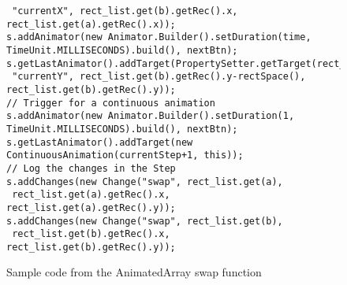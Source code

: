 \begin{figure}
\begin{center}
\begin{verbatim}
 "currentX", rect_list.get(b).getRec().x, rect_list.get(a).getRec().x));
s.addAnimator(new Animator.Builder().setDuration(time, TimeUnit.MILLISECONDS).build(), nextBtn);
s.getLastAnimator().addTarget(PropertySetter.getTarget(rect_list.get(b),
 "currentY", rect_list.get(b).getRec().y-rectSpace(), rect_list.get(b).getRec().y));
// Trigger for a continuous animation
s.addAnimator(new Animator.Builder().setDuration(1, TimeUnit.MILLISECONDS).build(), nextBtn);
s.getLastAnimator().addTarget(new ContinuousAnimation(currentStep+1, this));
// Log the changes in the Step
s.addChanges(new Change("swap", rect_list.get(a),
 rect_list.get(a).getRec().x, rect_list.get(a).getRec().y));
s.addChanges(new Change("swap", rect_list.get(b),
 rect_list.get(b).getRec().x, rect_list.get(b).getRec().y));
\end{verbatim}
\end{center}
\caption{Sample code from the AnimatedArray swap function}
\label{fig:swap}
\end{figure}